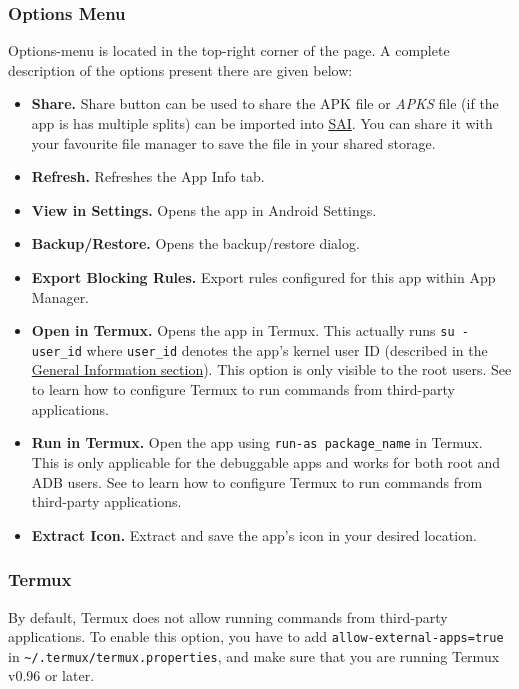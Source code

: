 \subsubsection{Options Menu}\label{subsubsec:app-info-options-menu}
Options-menu is located in the top-right corner of the page. A complete description of the options present there are
given below:
\begin{itemize}
    \item \textbf{Share.} Share button can be used to share the APK file or \textit{APKS} file (if the app is has
    multiple splits) can be imported into \href{https://github.com/Aefyr/SAI}{SAI}. You can share it with your favourite
    file manager to save the file in your shared storage.

    \item \textbf{Refresh.} Refreshes the App Info tab.
    \item \textbf{View in Settings.} Opens the app in Android Settings.
    \item \textbf{Backup/Restore.} Opens the backup/restore dialog.
    \item \textbf{Export Blocking Rules.} Export rules configured for this app within App Manager.

    \item \textbf{Open in Termux.} Opens the app in Termux. This actually runs \texttt{su - user\_id} where
    \texttt{user\_id} denotes the app's kernel user ID (described in the
    \hyperref[subsubsec:app-info-general-information]{General Information section}). This option is only visible to the
    root users. See  to learn how to configure Termux to run commands from third-party applications.

    \item \textbf{Run in Termux.} Open the app using \texttt{run-as package\_name} in Termux. This is only applicable
    for the debuggable apps and works for both root and ADB users. See  to learn how to
    configure Termux to run commands from third-party applications.

    \item \textbf{Extract Icon.} Extract and save the app's icon in your desired location.
\end{itemize}

\subsubsection{Termux}\label{subsubsec:config-termux}
By default, Termux does not allow running commands from third-party applications. To enable this option, you have to add
\texttt{allow-external-apps=true} in \texttt{\textasciitilde/.termux/termux.properties}, and make sure that you are
running Termux v0.96 or later.

